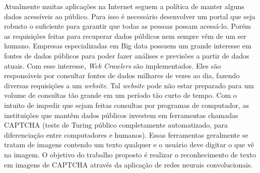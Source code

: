 \begin{resumo}
        
Atualmente muitas aplicações na Internet seguem a política de manter
alguns dados acessíveis ao público. Para isso é necessário desenvolver
um portal que seja robusto o suficiente para garantir que todas as
pessoas possam acessá-lo. Porém as requisições feitas para recuperar
dados públicos nem sempre vêm de um ser humano. Empresas
especializadas em Big data possuem um grande interesse em fontes de
dados públicos para poder fazer análises e previsões a partir de dados
atuais. Com esse interesse, \textit{Web Crawlers} são
implementados. Eles são responsáveis por consultar fontes de dados
milhares de vezes ao dia, fazendo diversas requisições a um
\textit{website}. Tal \textit{website} pode não estar preparado para
um volume de consultas tão grande em um período tão curto de
tempo. Com o intuito de impedir que sejam feitas consultas por
programas de computador, as instituições que mantêm dados públicos
investem em ferramentas chamadas CAPTCHA (teste de Turing público
completamente automatizado, para diferenciação entre computadores e
humanos). Essas ferramentas geralmente se tratam de imagens contendo
um texto qualquer e o usuário deve digitar o que vê na imagem. O
objetivo do trabalho proposto é realizar o reconhecimento de texto em
imagens de CAPTCHA através da aplicação de redes neurais
convolucionais.

\end{resumo}
